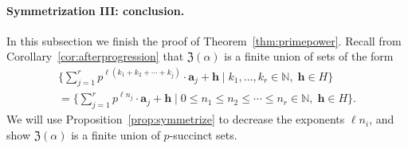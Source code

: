 \documentclass[letterpaper, 11pt, thm-restate]{article}
\numberwithin{equation}{section}
\newcommand{\N}{\mathbb{N}}
\newcommand{\mZ}{\mathfrak{Z}}
\newcommand{\ba}{\boldsymbol{a}}
\newcommand{\bh}{\boldsymbol{h}}
\theoremstyle{definition}
\theoremstyle{definition}
\theoremstyle{definition}
\begin{document}
\paragraph{Symmetrization III: conclusion.}
In this subsection we finish the proof of Theorem~\ref{thm:primepower}.
Recall from Corollary~\ref{cor:afterprogression} that $\mZ(\alpha)$ is a finite union of sets of the form
\begin{multline}\label{eq:unionm}
        \Bigg\{\sum_{j = 1}^{r} p^{\ell(k_1 + k_2 + \cdots + k_j)} \cdot \ba_j + \bh \;\Bigg|\; k_1, \ldots, k_r \in \N,\; \bh \in H \Bigg\} \\
        = \Bigg\{\sum_{j = 1}^{r} p^{\ell n_j} \cdot \ba_j + \bh \;\Bigg|\; 0 \leq n_1 \leq n_2 \leq \cdots \leq n_r \in \N,\; \bh \in H \Bigg\}.
\end{multline}
We will use Proposition~\ref{prop:symmetrize} to decrease the exponents $\ell n_i$, and show $\mZ(\alpha)$ is a finite union of $p$-succinct sets.
\end{document}
